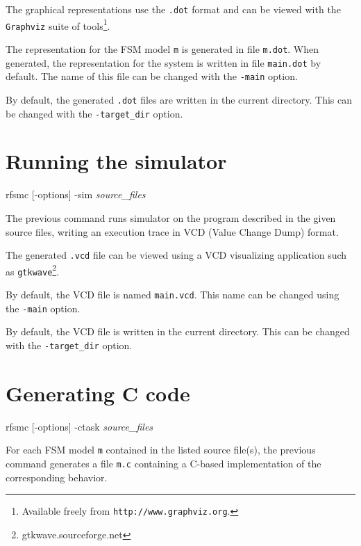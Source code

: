 The graphical representations use the \verb|.dot| format and can be viewed
with the \texttt{Graphviz} suite of tools\footnote{Available freely from
  \texttt{http://www.graphviz.org}.}.

The representation for the FSM model \verb|m| is generated in file \verb|m.dot|. When generated, the representation
for the system is written in file \verb|main.dot| by default. The name of this file can be changed
with the \verb|-main| option.

By default, the generated \verb|.dot| files are written in the current directory. This can be changed with the
\verb|-target_dir| option.

\section{Running the simulator}
\label{sec:running-simulator}

\begin{FVerbatim}[commandchars=\\\{\}]
rfsmc [-options] -sim \emph{source_files}
\end{FVerbatim}

The previous command runs simulator on the program described in the given source files, writing
an execution trace in VCD (Value Change Dump) format.

The generated \verb|.vcd| file can be viewed using a VCD visualizing application such as
\verb|gtkwave|\footnote{gtkwave.sourceforge.net}.

By default, the VCD file is named \verb|main.vcd|. This name can be changed using the \verb|-main| option.

By default, the VCD file is written in the current directory. This can be changed with the
\verb|-target_dir| option.

\section{Generating C code}
\label{sec:gener-c-code}

\begin{FVerbatim}[commandchars=\\\{\}]
rfsmc [-options] -ctask \emph{source_files}
\end{FVerbatim}

For each FSM model \verb|m| contained in the listed source file(s), the previous command generates a file
\verb|m.c| containing a C-based implementation of the corresponding behavior.

